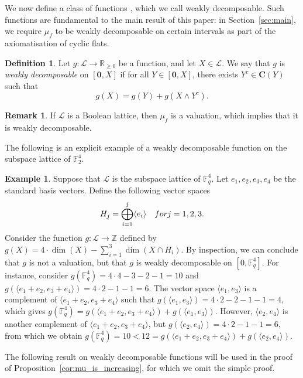 \documentclass[a4paper,11pt,reqno]{article}
\theoremstyle{definition}
\newtheorem{definition}[theorem]{{{Definition}}}
\newtheorem{example}[theorem]{{{Example}}}
\newtheorem{remark}[theorem]{{{Remark}}}
\newcommand{\zero}{{\mathbf{0}}}
\begin{document}
We now define a class of functions
, which we call weakly decomposable. Such functions are fundamental to the main result of this paper: in Section~\ref{sec:main}, we require $\mu_f$ to be weakly decomposable on certain intervals as part of the axiomatisation of cyclic flats.

\begin{definition}
    Let $g:\mathcal{L}\to\mathbb{R}_{\geq 0}$ be a function, and let $X\in\mathcal{L}$. We say that $g$ is \emph{weakly decomposable} on $[\zero,X]$ if for all $Y\in[\zero,X]$, there exists $Y^c\in\mathbf{C}(Y)$ such that 
    \[
        g(X)=g(Y)+g(X\wedge Y^c).
    \]
\end{definition}

\begin{remark}
    If $\mathcal{L}$ is a Boolean lattice, then $\mu_f$ is a valuation, which implies that it is weakly decomposable.
\end{remark}


The following is an explicit example of a weakly decomposable function on the subspace lattice of $\mathbb{F}_2^4$.

\begin{example}
    Suppose that $\mathcal{L}$ is the subspace lattice of $\mathbb{F}_q^4$. Let $e_1,e_2,e_3,e_4$ be the standard basis vectors. Define the following vector spaces
    $$H_j=\bigoplus_{i=1}^j\langle e_i\rangle\quad\textup{for }j=1,2,3.$$
    Consider the function $g:\mathcal{L}\to\mathbb{Z}$ defined by
    $g(X)=4\cdot\dim(X)-\sum_{i=1}^3\dim(X\cap H_i).$
    By inspection, we can conclude that $g$ is not a valuation, but that $g$ is weakly decomposable on $[0,\mathbb{F}_q^4]$. For instance, consider
    $g(\mathbb{F}_q^4)=4\cdot 4-3-2-1=10$ and $g(\langle e_1+e_2,e_3+e_4\rangle)=4\cdot 2-1-1=6.$
    The vector space $\langle e_1,e_3\rangle$ is a complement of $\langle e_1+e_2,e_3+e_4\rangle$ such that 
    $g(\langle e_1,e_3\rangle)=4\cdot 2-2-1-1=4,$
    which gives $g(\mathbb{F}_q^4)=g(\langle e_1+e_2,e_3+e_4\rangle)+g(\langle e_1,e_3\rangle).$
    However, $\langle e_2,e_4\rangle$ is another complement of $\langle e_1+e_2,e_3+e_4\rangle$, but
    $g(\langle e_2,e_4\rangle)=4\cdot 2-1-1=6,$
    from which we obtain
    $g(\mathbb{F}_q^4)=10<12=g(\langle e_1+e_2,e_3+e_4\rangle)+g(\langle e_2,e_4\rangle).$
\end{example}

The following result on weakly decomposable functions will be used in the proof of Proposition~\ref{cor:mu_is_increasing}, for which we omit the simple proof.
\end{document}
